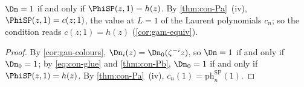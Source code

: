 \begin{cor}
\label{cor:con-A2}
$\Dn=1$ if and only if $\PhiSP(z,1)=h(z)$. By \cref{thm:con-Pa}~(iv), $\PhiSP(z,1)=c(z;1)$, the value at $L=1$ of the Laurent polynomials $c_n$; so the condition reads $c(z;1)=h(z)$ (\cref{cor:gam-equiv}).
\end{cor}

\begin{proof}
By \cref{cor:gau-colours}, $\Dn_i(z)=\Dn_0(\zeta^{-i}z)$, so $\Dn=1$ if and only if $\Dn_0=1$; by \eqref{eq:con-glue} and \cref{thm:con-Pb}, $\Dn_0=1$ if and only if $\PhiSP(z,1)=h(z)$. By \cref{thm:con-Pa}~(iv), $c_n(1)=\mathrm{ph}^{\mathrm{SP}}_n(1)$.
\end{proof}
